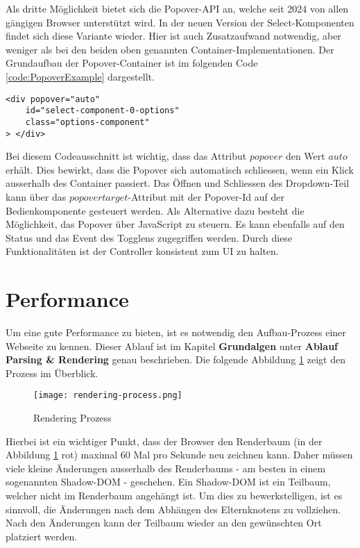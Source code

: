 Als dritte Möglichkeit bietet sich die Popover-API an, welche seit 2024 von allen gängigen Browser unterstützt wird.
In der neuen Version der Select-Komponenten findet sich diese Variante wieder.
Hier ist auch Zusatzaufwand notwendig, aber weniger als bei den beiden oben genannten Container-Implementationen.
Der Grundaufbau der Popover-Container ist im folgenden Code \ref{code:PopoverExample} dargestellt.

\begin{lstlisting}[style = htmlcssjs, caption = Popover-Container Beispiel, label = code:PopoverExample]
<div popover="auto"
    id="select-component-0-options" 
    class="options-component" 
> </div>
\end{lstlisting}

Bei diesem Codeausschnitt ist wichtig, dass das Attribut $popover$ den Wert $auto$ erhält.
Dies bewirkt, dass die Popover sich automatisch schliessen, wenn ein Klick ausserhalb des Container passiert.
Das Öffnen und Schliessen des Dropdown-Teil kann über das $popovertarget$-Attribut mit der Popover-Id auf der Bedienkomponente gesteuert werden.
Als Alternative dazu besteht die Möglichkeit, das Popover über JavaScript zu steuern.
Es kann ebenfalls auf den Status und das Event des Togglens zugegriffen werden.
Durch diese Funktionalitäten ist der Controller konsistent zum UI zu halten.


\section{Performance}

Um eine gute Performance zu bieten, ist es notwendig den Aufbau-Prozess einer Webseite zu kennen.
Dieser Ablauf ist im Kapitel \textbf{Grundalgen} unter \textbf{Ablauf Parsing \& Rendering} genau beschrieben.
Die folgende Abbildung \ref{img:RenderingProcessRecap} zeigt den Prozess im Überblick.

\begin{figure}[!htb]
    \centering
    \texttt{[image: rendering-process.png]}
    \caption{Rendering Prozess}
    \label{img:RenderingProcessRecap}
\end{figure}

Hierbei ist ein wichtiger Punkt, dass der Browser den Renderbaum (in der Abbildung \ref{img:RenderingProcessRecap} rot) maximal 60 Mal pro Sekunde neu zeichnen kann.
Daher müssen viele kleine Änderungen ausserhalb des Renderbaums - am besten in einem sogenannten Shadow-DOM - geschehen.
Ein Shadow-DOM ist ein Teilbaum, welcher nicht im Renderbaum angehängt ist.
Um dies zu bewerkstelligen, ist es sinnvoll, die Änderungen nach dem Abhängen des Elternknotens zu vollziehen. 
Nach den Änderungen kann der Teilbaum wieder an den gewünschten Ort platziert werden.

